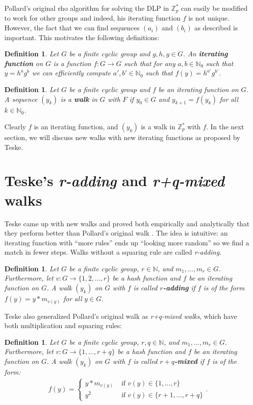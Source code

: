 \documentclass{article}
\newcommand{\ZZ}{\mathbb{Z}}
\newcommand{\NN}{\mathbb{N}}
\newtheorem{defn}[thm]{Definition}
\begin{document}
Pollard's original rho algorithm for solving the DLP in $\ZZ_p^*$ can easily be modified to work for other groups and indeed, his iterating function $f$ is not unique. However, the fact that we can find sequences $(a_i)$ and $(b_i)$ as described is important. This motivates the following definitions:

\begin{defn}
	Let $G$ be a finite cyclic group and $g,h,y \in G$. An \textbf{iterating function} on $G$ is a function $f: G \to G$ such that for any $a,b \in \NN_0$ such that $y=h^a g^b$ we can efficiently compute $a', b' \in \NN_0$ such that $f(y)=h^{a'} g^{b'}$.
\end{defn}

\begin{defn}
	Let $G$ be a finite cyclic group and $f$ be an iterating function on $G$. A sequence $(y_k)$ is a \textbf{walk} in $G$ with $F$ if $y_0 \in G$ and $y_{k+1} = f(y_{k})$ for all $k \in \NN_0$.
\end{defn}

Clearly $f$ is an iterating function, and $(y_k)$ is a walk in $\ZZ_p^*$ with $f$. In the next section, we will discuss new walks with new iterating functions as proposed by Teske.

\section{Teske's \textit{r-adding} and \textit{r+q-mixed} walks}

Teske came up with new walks and proved both empirically and analytically that they perform better than Pollard's original walk \cite{Teske01}. The idea is intuitive: an iterating function with ``more rules'' ends up ``looking more random'' so we find a match in fewer steps. Walks without a squaring rule are called \textit{r-adding}.

\begin{defn}
	Let $G$ be a finite cyclic group, $r \in \NN$, and $m_1, \ldots, m_r \in G$. Furthermore, let $v: G \to \{1, 2, \ldots, r\}$ be a hash function and $f$ be an iterating function on $G$. A walk $(y_k)$ on $G$ with $f$ is called \textbf{$r$-adding} if $f$ is of the form $f(y) = y * m_{v(y)}$ for all $y \in G$.
\end{defn}

Teske also generalized Pollard's original walk as \textit{r+q-mixed walks}, which have both multiplication and squaring rules:

\begin{defn}
	Let $G$ be a finite cyclic group, $r,q \in \NN$, and $m_1, \ldots, m_r \in G$. Furthermore, let $v: G \to \{1, \ldots, r+q\}$ be a hash function and $f$ be an iterating function on $G$. A walk $(y_k)$ on $G$ with $f$ is called \textbf{$r+q$-mixed} if $f$ is of the form:
	\begin{align*}
		f(y) = \begin{cases}
			y * m_{v(y)} & \text{ if } v(y) \in \{1,\ldots,r\} \\
			y^2 & \text{ if } v(y) \in \{r+1, \ldots, r+q\}
		\end{cases}.
	\end{align*}
\end{defn}
\end{document}
